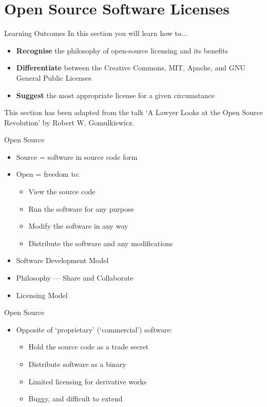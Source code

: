 \part{Open Source Software Licenses}
\frame{\partpage}

\begin{frame}{Learning Outcomes}
	In this section you will learn how to...
	
	\begin{itemize}
		\item \textbf{Recognise} the philosophy of open-source licensing and its benefits
		\item \textbf{Differentiate} between the Creative Commons, MIT, Apache, and GNU General Public Licenses
		\item \textbf{Suggest} the most appropriate license for a given circumstance
	\end{itemize}
	
	This section has been adapted from the talk `A Lawyer Looks at the Open Source Revolution' by Robert W. Gomulkiewicz.
\end{frame}

\begin{frame}{Open Source}
	\begin{itemize}
		\item Source = software in source code form
		\item Open = freedom to:
		\begin{itemize}
			\item View the source code
			\item Run the software for any purpose
			\item Modify the software in any way
			\item Distribute the software and any modifications
		\end{itemize}
		\item Software Development Model
		\item Philosophy --- Share and Collaborate
		\item Licensing Model
	\end{itemize}
\end{frame}

\begin{frame}{Open Source}
	\begin{itemize}
		\item Opposite of `proprietary' (`commercial') software:
		\begin{itemize}
			\item Hold the source code as a trade secret
			\item Distribute software as a binary
			\item Limited licensing for derivative works
			\item Buggy, and difficult to extend
		\end{itemize}
	\end{itemize}
\end{frame}

